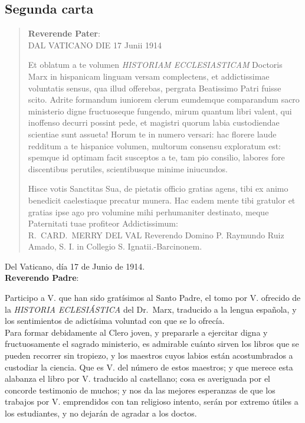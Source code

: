 \raggedbottom{} \documentclass[12pt, a4paper]{book}
\begin{document}
\subsection{Segunda carta}
\begin{quotation}
  \begin{flushright}
    \textbf{Reverende Pater}:\\
    DAL VATICANO DIE 17 Junii 1914
  \end{flushright}

  \noindent Et oblatum a te volumen \textit{HISTORIAM ECCLESIASTICAM} Doctoris Marx in hispanicam linguam versam complectens, et addictissimae voluntatis sensus, qua illud offerebas, pergrata Beatissimo Patri fuisse scito. Adrite formandum iuniorem clerum eumdemque comparandum sacro ministerio digne fructuoseque fungendo, mirum quantum libri valent, qui inoffenso decurri possint pede, et magistri quorum labia custodiendae scientiae sunt assueta! Horum te in numero versari: hac florere laude redditum a te hispanice volumen, multorum consensu exploratum est: spemque id optimam facit susceptos a te, tam pio consilio, labores fore discentibus perutiles, scientibusque minime iniucundos.

  Hisce votis Sanctitas Sua, de pietatis officio gratias agens, tibi ex animo benedicit caelestiaque precatur munera. Hac eadem mente tibi gratulor et gratias ipse ago pro volumine mihi perhumaniter destinato, meque Paternitati tuae profiteor Addictissimum:\\
  R.\ CARD.\ MERRY DEL VAL
  Reverendo Domino P. Raymundo Ruiz Amado, S. I. in Collegio
  S. Ignatii.-Barcinonem.
\end{quotation}
\newpage
\begin{flushright}
  Del Vaticano, día 17 de Junio de 1914.\\
  \textbf{Reverendo Padre}:
\end{flushright}

Participo a V. que han sido gratísimos al Santo Padre, el tomo por V. ofrecido de la \textit{HISTORIA ECLESIÁSTICA} del Dr.\ Marx, traducido a la lengua española, y los sentimientos de adictísima voluntad con que se lo ofrecía.\\
Para formar debidamente al Clero joven, y prepararle a ejercitar digna y fructuosamente el sagrado ministerio, es admirable cuánto sirven los libros que se pueden recorrer sin tropiezo, y los maestros cuyos labios están acostumbrados a custodiar la ciencia. Que es V. del número de estos maestros; y que merece esta alabanza el libro por V. traducido al castellano; cosa es averiguada por el concorde testimonio de muchos; y nos da las mejores esperanzas de que los trabajos por V. emprendidos con tan religioso intento, serán por extremo útiles a los estudiantes, y no dejarán de agradar a los doctos.
\end{document}
